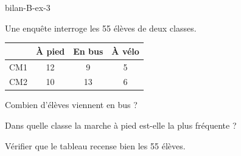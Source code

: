 \begin{blocEdition}{bilan-B-ex-3}
\begin{questions}
\item Une enquête interroge les 55 élèves de deux classes.\begin{center}\renewcommand{\arraystretch}{1.35}\begin{tabular}{c|ccc}\toprule
 & À pied & En bus & À vélo\\\midrule
CM1 & 12 & 9 & 5\\
CM2 & 10 & 13 & 6\\
\bottomrule\end{tabular}\end{center}Combien d’élèves viennent en bus ?
\item Dans quelle classe la marche à pied est-elle la plus fréquente ?
\item Vérifier que le tableau recense bien les 55 élèves.
\end{questions}\par{}\par\par{}\par{}\par{}\par{}\par{}\par{}
\end{blocEdition}
